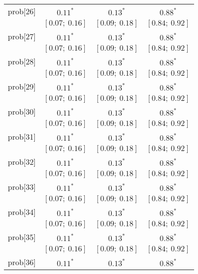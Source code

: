 \begin{table}
\begin{center}
\begin{tabular}{l c c c }
prob[26]  & $0.11^{*}$              & $0.13^{*}$              & $0.88^{*}$            \\
          & $[0.07;\ 0.16]$         & $[0.09;\ 0.18]$         & $[0.84;\ 0.92]$       \\
prob[27]  & $0.11^{*}$              & $0.13^{*}$              & $0.88^{*}$            \\
          & $[0.07;\ 0.16]$         & $[0.09;\ 0.18]$         & $[0.84;\ 0.92]$       \\
prob[28]  & $0.11^{*}$              & $0.13^{*}$              & $0.88^{*}$            \\
          & $[0.07;\ 0.16]$         & $[0.09;\ 0.18]$         & $[0.84;\ 0.92]$       \\
prob[29]  & $0.11^{*}$              & $0.13^{*}$              & $0.88^{*}$            \\
          & $[0.07;\ 0.16]$         & $[0.09;\ 0.18]$         & $[0.84;\ 0.92]$       \\
prob[30]  & $0.11^{*}$              & $0.13^{*}$              & $0.88^{*}$            \\
          & $[0.07;\ 0.16]$         & $[0.09;\ 0.18]$         & $[0.84;\ 0.92]$       \\
prob[31]  & $0.11^{*}$              & $0.13^{*}$              & $0.88^{*}$            \\
          & $[0.07;\ 0.16]$         & $[0.09;\ 0.18]$         & $[0.84;\ 0.92]$       \\
prob[32]  & $0.11^{*}$              & $0.13^{*}$              & $0.88^{*}$            \\
          & $[0.07;\ 0.16]$         & $[0.09;\ 0.18]$         & $[0.84;\ 0.92]$       \\
prob[33]  & $0.11^{*}$              & $0.13^{*}$              & $0.88^{*}$            \\
          & $[0.07;\ 0.16]$         & $[0.09;\ 0.18]$         & $[0.84;\ 0.92]$       \\
prob[34]  & $0.11^{*}$              & $0.13^{*}$              & $0.88^{*}$            \\
          & $[0.07;\ 0.16]$         & $[0.09;\ 0.18]$         & $[0.84;\ 0.92]$       \\
prob[35]  & $0.11^{*}$              & $0.13^{*}$              & $0.88^{*}$            \\
          & $[0.07;\ 0.16]$         & $[0.09;\ 0.18]$         & $[0.84;\ 0.92]$       \\
prob[36]  & $0.11^{*}$              & $0.13^{*}$              & $0.88^{*}$            \\

\end{tabular}
\end{center}
\end{table}
